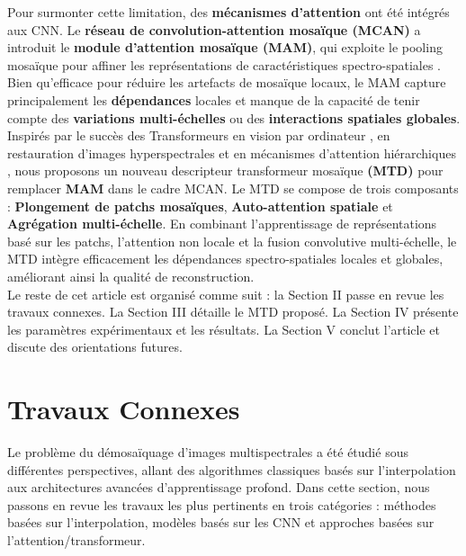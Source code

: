 \documentclass[conference]{IEEEtran}
\begin{document}
Pour surmonter cette limitation, des \textbf{mécanismes d'attention} ont été intégrés aux CNN. Le \textbf{réseau de convolution-attention mosaïque (MCAN)} a introduit le \textbf{module d'attention mosaïque (MAM)}, qui exploite le pooling mosaïque pour affiner les représentations de caractéristiques spectro-spatiales \cite{Feng2021}. Bien qu'efficace pour réduire les artefacts de mosaïque locaux, le MAM capture principalement les \textbf{dépendances} locales et manque de la capacité de tenir compte des \textbf{variations multi-échelles} ou des \textbf{interactions spatiales globales}.  \\
Inspirés par le succès des Transformeurs en vision par ordinateur \cite{Vaswani2023}, en restauration d'images hyperspectrales \cite{Fu2024} et en mécanismes d'attention hiérarchiques \cite{Liu2021}, nous proposons un nouveau descripteur transformeur mosaïque \textbf{(MTD)} pour remplacer \textbf{MAM} dans le cadre MCAN. Le MTD se compose de trois composants : \textbf{Plongement de patchs mosaïques}, \textbf{Auto-attention spatiale} et \textbf{Agrégation multi-échelle}. En combinant l'apprentissage de représentations basé sur les patchs, l'attention non locale et la fusion convolutive multi-échelle, le MTD intègre efficacement les dépendances spectro-spatiales locales et globales, améliorant ainsi la qualité de reconstruction. \\

Le reste de cet article est organisé comme suit : la Section II passe en revue les travaux connexes. La Section III détaille le MTD proposé. La Section IV présente les paramètres expérimentaux et les résultats. La Section V conclut l'article et discute des orientations futures.



\section{Travaux Connexes}
Le problème du démosaïquage d'images multispectrales a été étudié sous différentes perspectives, allant des algorithmes classiques basés sur l'interpolation aux architectures avancées d'apprentissage profond. Dans cette section, nous passons en revue les travaux les plus pertinents en trois catégories : méthodes basées sur l'interpolation, modèles basés sur les CNN et approches basées sur l'attention/transformeur.
\end{document}
